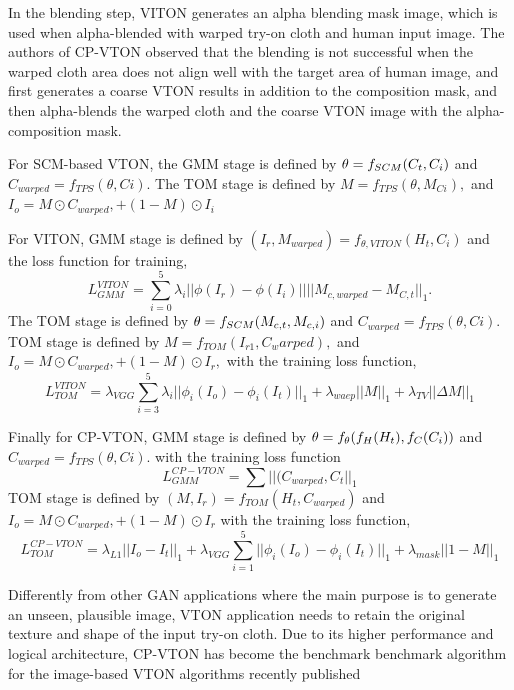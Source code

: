 In the blending step, VITON generates an alpha blending mask image, which is used when alpha-blended with warped try-on cloth and human input image. The authors of CP-VTON observed that the blending is not successful when the warped  cloth area does not align well with the target area of human image, and first generates a coarse VTON results in addition to the composition mask, and then alpha-blends the warped cloth and the coarse VTON image with the alpha-composition mask.        

For SCM-based VTON, the GMM stage is defined by  
$
   \bold{\theta} = f_{SCM} (C_t, C_i)
$
and
$
   C_{warped} = f_{TPS}(\theta, Ci)
$.    
The TOM stage is defined by 
$
   M = f_{TPS}(\theta, M_{Ci}),
$    
and 
$
   I_o = M \odot C_{warped}, + (1-M) \odot I_i 
$

For VITON, GMM stage is defined by 
$
   (I_{r}, M_{warped}) = f_{\theta, VITON} (H_t, C_i) 
$
and the loss function for training, 
\[
   L_{GMM}^{VITON} =   \sum_{i=0}^{5} \lambda_i || \phi (I_r) - \phi (I_i)||  
   ||M_{c, warped} -  M_{C,t}||_1 .
\]
The TOM stage is defined by 
$
   \bold{\theta} = f_{SCM} (M_{c,t}, M_{c,i})
$
and
$
   C_{warped} = f_{TPS}(\theta, Ci) .
$    
TOM stage is defined by 
$
 M = f_{TOM} ( I_{r1}, C_warped ),  
$
and 
$
   I_o = M \odot C_{warped}, + (1-M) \odot I_{r},
$
with the training loss function, 
\[
   L_{TOM}^{VITON} = \lambda_{VGG} \sum_{i=3}^{5} \lambda_i || \phi_i(I_o) - \phi_i(I_t)||_{1}  + 
             \lambda_{waep}  || M ||_{1}  + 
             \lambda_{TV} || \Delta M||_{1}      
\]

Finally for CP-VTON, GMM stage is defined by 
$  
   \bold{\theta} = f_{\theta} ( f_H (H_t), f_C(C_i) )
$
and
$
   C_{warped} = f_{TPS}(\theta, Ci).
$    
with the training loss function
\[
   L_{GMM}^{CP-VTON} =  \sum ||(C_{warped}, C_t||_1
\]
TOM stage is defined by 
$
 (M, I_r) = f_{TOM} ( H_t, C_{warped} )  
$
and 
$
   I_o = M \odot C_{warped}, + (1-M) \odot I_r
$
with the training loss function, 
\[
   L_{TOM}^{CP-VTON} = \lambda_{L1}  || I_o - I_t ||_1  + 
             \lambda_{VGG} \sum_{i=1}^{5} || \phi_i(I_o) - \phi_i(I_t)||_1  + 
             \lambda_{mask} || 1 - M ||_1      
\]


Differently from other GAN applications where the main purpose is to generate an unseen, plausible image, VTON application needs to retain the original texture and shape of the input try-on cloth. Due to its higher performance and logical architecture, CP-VTON \cite{Wang2018TowardCI} has become the benchmark benchmark algorithm for the image-based VTON algorithms recently published 


